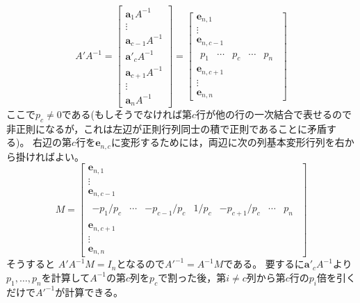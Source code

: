         \[
            A'A^{-1} =
            \begin{bmatrix}
                \bm{a}_1 A^{-1} \\
                \vdots \\
                \bm{a}_{c-1} A^{-1} \\
                \bm{a}'_c A^{-1} \\
                \bm{a}_{c+1} A^{-1} \\
                \vdots \\
                \bm{a}_n A^{-1}
            \end{bmatrix}
            =
            \begin{bmatrix}
                \bm{e}_{n,1} \\
                \vdots \\
                \bm{e}_{n,c-1} \\
                \begin{matrix}
                    p_1 & \cdots & p_c & \cdots & p_n
                \end{matrix} \\
                \bm{e}_{n,c+1} \\
                \vdots \\
                \bm{e}_{n,n}
            \end{bmatrix}
        \]
        ここで$p_c\neq 0$である(もしそうでなければ第$c$行が他の行の一次結合で表せるので非正則になるが，これは左辺が正則行列同士の積で正則であることに矛盾する)。
        右辺の第$c$行を$\bm{e}_{n,c}$に変形するためには，両辺に次の列基本変形行列を右から掛ければよい。
        \[
            M =
            \begin{bmatrix}
                \bm{e}_{n,1} \\
                \vdots \\
                \bm{e}_{n,c-1} \\
                \begin{matrix}
                    -p_1/p_c & \cdots & -p_{c-1}/p_c & 1/p_c & -p_{c+1}/p_c & \cdots & p_n
                \end{matrix} \\
                \bm{e}_{n,c+1} \\
                \vdots \\
                \bm{e}_{n,n}
            \end{bmatrix}
        \]
        そうすると
        $A'A^{-1}M = I_n$となるので$A'^{-1} = A^{-1}M$である。
        要するに$\bm{a}'_c A^{-1}$より$p_1,\dotsc,p_n$を計算して$A^{-1}$の第$c$列を$p_c$で割った後，第$i\neq c$列から第$c$行の$p_i$倍を引くだけで$A'^{-1}$が計算できる。

